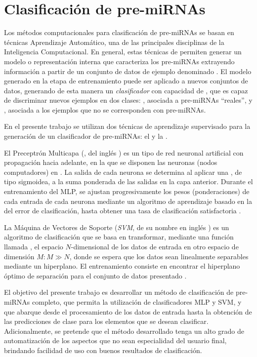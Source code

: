 \section{Clasificación de pre-miRNAs}
Los métodos computacionales para clasificación de pre-miRNAs se basan
en técnicas Aprendizaje Automático, una de las principales disciplinas
de la Inteligencia Computacional.  En general, estas técnicas de
 permiten generar un modelo o
representación interna que caracteriza los pre-miRNAs extrayendo
información a partir de un conjunto de datos de ejemplo denominado
.  El modelo generado en la etapa de
entrenamiento puede ser aplicado a nuevos conjuntos de datos,
generando de esta manera un \emph{clasificador} con capacidad de
, que es capaz de discriminar nuevos ejemplos en dos
clases: , asociada a pre-miRNAs ``reales'', y
, asociada a los ejemplos que no se corresponden con
pre-miRNAs.

En el presente trabajo se utilizan dos técnicas de aprendizaje
supervisado para la generación de un clasificador de pre-miRNAs: el
 \cite{mlp1}\cite{mlp2} y la  \cite{svm}.

El Preceptrón Multicapa (, del inglés ) es un tipo de red neuronal artificial con propagación
hacia adelante, en la que se disponen las neuronas (nodos
computadores) en . La salida de cada neurona se determina al
aplicar una , de tipo sigmoidea, a la suma
ponderada de las salidas en la capa anterior. Durante el entrenamiento
del MLP, se ajustan progresivamente los pesos (ponderaciones) de cada
entrada de cada neurona mediante un algoritmo de aprendizaje basado en
la  del error de clasificación, hasta
obtener una tasa de clasificación satisfactoria \cite{jain}.

La Máquina de Vectores de Soporte (\emph{SVM}, de su nombre en inglés
) es un algoritmo de clasificación que se
basa en transformar, mediante una función llamada , el
espacio $N$-dimensional de los datos de entrada en otro espacio de
dimensión $M: M\gg N$, donde se espera que los datos sean linealmente
separables mediante un hiperplano. El entrenamiento consiste en
encontrar el hiperplano óptimo de separación para el conjunto de datos
presentado \cite{bottou}.

El objetivo del presente trabajo es desarrollar un método de
clasificación de pre-miRNAs completo, que permita la utilización de
clasificadores MLP y SVM, y que abarque desde el procesamiento de los
datos de entrada hasta la obtención de las predicciones de clase para
los elementos que se desean clasificar. Adicionalmente, se pretende
que el método desarrollado tenga un alto grado de automatización de
los aspectos que no sean especialidad del usuario final, brindando
facilidad de uso con buenos resultados de clasificación.

